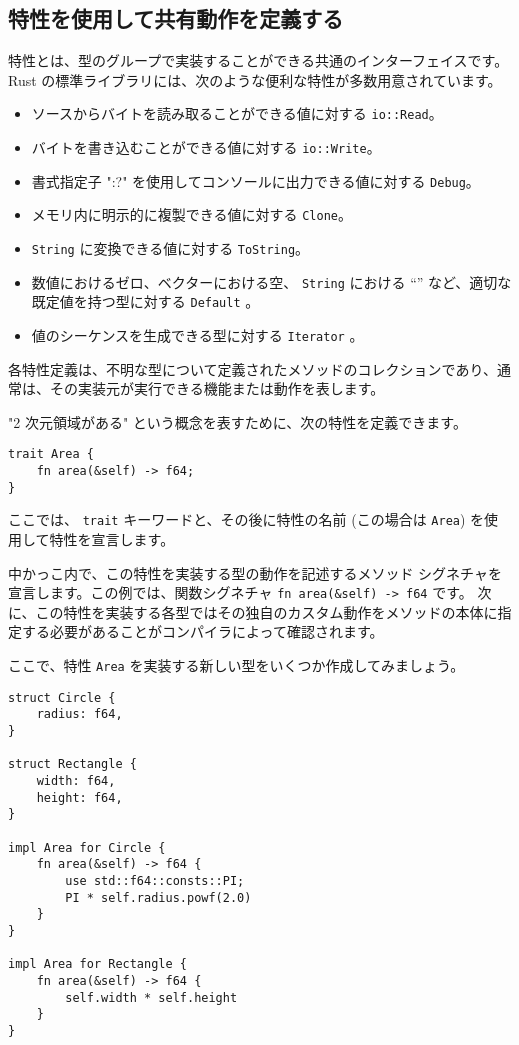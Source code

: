 \subsection{特性を使用して共有動作を定義する}

特性とは、型のグループで実装することができる共通のインターフェイスです。 Rust の標準ライブラリには、次のような便利な特性が多数用意されています。

\begin{itemize}
\item ソースからバイトを読み取ることができる値に対する \texttt{io::Read}。
\item バイトを書き込むことができる値に対する \texttt{io::Write}。
\item 書式指定子 "{:?}" を使用してコンソールに出力できる値に対する \texttt{Debug}。
\item メモリ内に明示的に複製できる値に対する \texttt{Clone}。
\item \texttt{String} に変換できる値に対する \texttt{ToString}。
\item 数値におけるゼロ、ベクターにおける空、 \texttt{String} における “” など、適切な既定値を持つ型に対する \texttt{Default} 。
\item 値のシーケンスを生成できる型に対する \texttt{Iterator} 。
\end{itemize}

各特性定義は、不明な型について定義されたメソッドのコレクションであり、通常は、その実装元が実行できる機能または動作を表します。

"2 次元領域がある" という概念を表すために、次の特性を定義できます。


\begin{lstlisting}[numbers=none]
trait Area {
    fn area(&self) -> f64;
}
\end{lstlisting}

ここでは、 \texttt{trait} キーワードと、その後に特性の名前 (この場合は \texttt{Area}) を使用して特性を宣言します。

中かっこ内で、この特性を実装する型の動作を記述するメソッド シグネチャを宣言します。この例では、関数シグネチャ \texttt{fn area(\&self) -> f64} です。 次に、この特性を実装する各型ではその独自のカスタム動作をメソッドの本体に指定する必要があることがコンパイラによって確認されます。

ここで、特性 \texttt{Area} を実装する新しい型をいくつか作成してみましょう。


\begin{lstlisting}[numbers=none]
struct Circle {
    radius: f64,
}

struct Rectangle {
    width: f64,
    height: f64,
}

impl Area for Circle {
    fn area(&self) -> f64 {
        use std::f64::consts::PI;
        PI * self.radius.powf(2.0)
    }
}

impl Area for Rectangle {
    fn area(&self) -> f64 {
        self.width * self.height
    }
}
\end{lstlisting}


